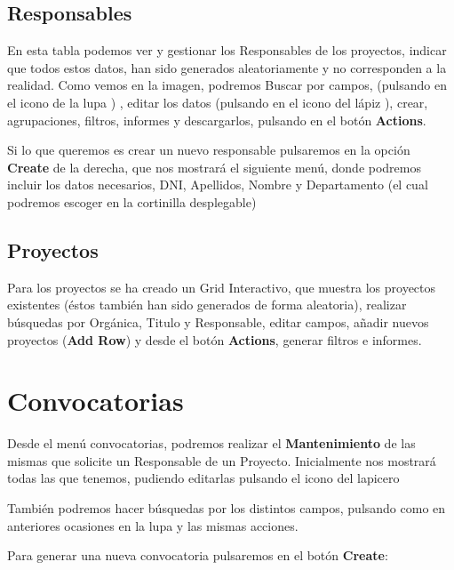 \subsection{Responsables}\label{responsables}

En esta tabla podemos ver y gestionar los Responsables de los proyectos,
indicar que todos estos datos, han sido generados aleatoriamente y no corresponden a la realidad. Como vemos en la imagen, podremos Buscar por campos, (pulsando en el icono de la lupa ) , editar los datos (pulsando en el icono del lápiz ), crear, agrupaciones, filtros, informes y descargarlos, pulsando en el botón \textbf{Actions}.


Si lo que queremos es crear un nuevo responsable pulsaremos en la opción \textbf{Create} de la derecha, que nos mostrará el siguiente menú, donde podremos incluir los datos necesarios, DNI, Apellidos, Nombre y
Departamento (el cual podremos escoger en la cortinilla desplegable)


\subsection{Proyectos}\label{proyectos}

Para los proyectos se ha creado un Grid Interactivo, que muestra los proyectos existentes (éstos también han sido generados de forma aleatoria), realizar búsquedas por Orgánica, Titulo y Responsable, editar campos, añadir nuevos proyectos (\textbf{Add Row}) y desde el botón \textbf{Actions}, generar filtros e informes.


\section{Convocatorias}\label{convocatorias}

Desde el menú convocatorias, podremos realizar el \textbf{Mantenimiento} de las mismas que solicite un Responsable de un Proyecto. Inicialmente nos mostrará todas las que tenemos, pudiendo editarlas pulsando el icono del lapicero

También podremos hacer búsquedas por los distintos campos, pulsando como en anteriores ocasiones en la lupa y las mismas acciones.

Para generar una nueva convocatoria pulsaremos en el botón \textbf{Create}:

